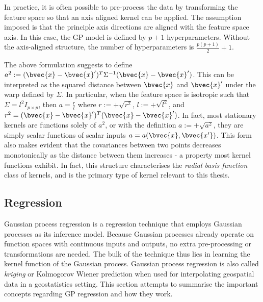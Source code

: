 			In practice, it is often possible to pre-process the data by transforming the feature space so that an axis aligned kernel can be applied. The assumption imposed is that the principle axis directions are aligned with the feature space axis. In this case, the GP model is defined by $p + 1$ hyperparameters. Without the axis-aligned structure, the number of hyperparameters is $\frac{p(p + 1)}{2} + 1$.
			
			The above formulation suggests to define $a^{2} := (\bvec{x} - \bvec{x}')^{T} \Sigma^{-1} (\bvec{x} - \bvec{x}')$. This can be interpreted as the squared distance between $\bvec{x}$ and $\bvec{x}'$ under the warp defined by $\Sigma$. In particular, when the feature space is isotropic such that $\Sigma = l^{2} I_{p \times p}$, then $a = \frac{r}{l}$ where $r := +\sqrt{r^{2}}$, $l := +\sqrt{l^{2}}$, and $r^{2} = (\bvec{x} - \bvec{x}')^{T} (\bvec{x} - \bvec{x}')$. In fact, most stationary kernels are functions solely of $a^{2}$, or with the definition $a := +\sqrt{a^{2}}$, they are simply scalar functions of scalar inputs $a = a (\bvec{x}, \bvec{x'})$. This form also makes evident that the covariances between two points decreases monotonically as the distance between them increases - a property most kernel functions exhibit. In fact, this structure characterises the \textit{radial basis function} class of kernels, and is the primary type of kernel relevant to this thesis.
			
		\subsection{Regression}
		\label{Background:GaussianProcesses:Regression}
		
			Gaussian process regression is a regression technique that employs Gaussian processes as its inference model. Because Gaussian processes already operate on function spaces with continuous inputs and outputs, no extra pre-processing or transformations are needed. The bulk of the technique thus lies in learning the kernel function of the Gaussian process. Gaussian process regression is also called \textit{kriging} or Kolmogorov Wiener prediction when used for interpolating geospatial data in a geostatistics setting. This section attempts to summarise the important concepts regarding GP regression and how they work.
			
